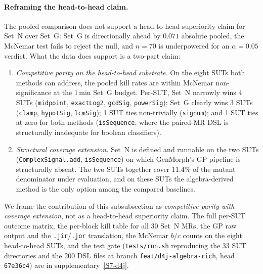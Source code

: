 \paragraph{Reframing the head-to-head claim.}
The pooled comparison does not support a head-to-head superiority
claim for Set~N over Set~G: Set~G is directionally ahead by $0.071$
absolute pooled, the McNemar test fails to reject the null, and
$n = 70$ is underpowered for an $\alpha = 0.05$ verdict. What the
data does support is a two-part claim:
\begin{enumerate}[nosep,leftmargin=*]
  \item \emph{Competitive parity on the head-to-head substrate.} On
        the eight SUTs both methods can address, the pooled kill
        rates are within McNemar non-significance at the 1\,min
        Set~G budget. Per-SUT, Set~N narrowly wins 4 SUTs
        (\texttt{midpoint}, \texttt{exactLog2}, \texttt{gcdSig},
        \texttt{powerSig}); Set~G clearly wins 3 SUTs
        (\texttt{clamp}, \texttt{hypotSig}, \texttt{lcmSig}); 1 SUT
        ties non-trivially (\texttt{signum}); and 1 SUT ties at zero
        for both methods (\texttt{isSequence}, where the paired-MR
        DSL is structurally inadequate for boolean classifiers).
  \item \emph{Structural coverage extension.} Set~N is defined and
        runnable on the two SUTs (\texttt{ComplexSignal.add},
        \texttt{isSequence}) on which GenMorph's GP pipeline is
        structurally absent. The two SUTs together cover $11.4\%$ of
        the mutant denominator under evaluation, and on these SUTs
        the algebra-derived method is the only option among the
        compared baselines.
\end{enumerate}
We frame the contribution of this subsubsection as
\emph{competitive parity with coverage extension}, not as a
head-to-head superiority claim. The full per-SUT outcome matrix, the
per-block kill table for all 30 Set~N MRs, the GP raw output and the
\texttt{.jir}/\texttt{.jor} translation, the McNemar $b/c$ counts on
the eight head-to-head SUTs, and the test gate
(\texttt{tests/run.sh} reproducing the 33 SUT directories and the
200 DSL files at branch \texttt{feat/d4j-algebra-rich}, head
\texttt{67e36c4}) are in supplementary~\ref{S7-d4j}.

